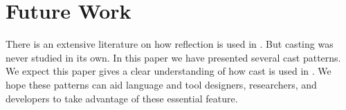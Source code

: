 \section{Future Work}




There is an extensive literature on how reflection is used in \java{}.
But casting was never studied in its own.
In this paper we have presented several cast patterns.
We expect this paper gives a clear understanding of how cast is used in \java{}.
We hope these patterns can aid language and tool designers,
researchers, and developers to take advantage of these essential feature.